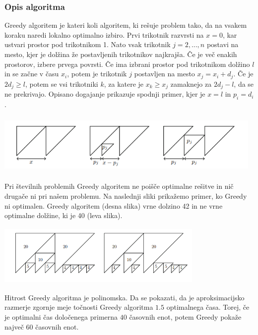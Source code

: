 \documentclass[a4paper,12pt]{article}
\theoremstyle{definition}
\theoremstyle{plain}
\begin{document}
\subsubsection{Opis algoritma}
Greedy algoritem je kateri koli algoritem, ki rešuje problem tako, da na vsakem koraku naredi lokalno optimalno izbiro. Prvi trikotnik razvrsti na $x=0$, kar ustvari prostor pod trikotnikom 1.
Nato vsak trikotnik $j=2,...,n$ postavi na mesto, kjer je dolžina že postavljenih trikotnikov najkrajša. Če je več enakih prostorov, izbere prvega povrsti.
Če ima izbrani prostor pod trikotnikom dolžino $l$ in se začne v času $x_i$, potem je trikotnik $j$ postavljen na mesto $x_j=x_i+d_j$. Če je $2d_j \ge l$,  potem se vsi trikotniki $k$, za katere je $x_k \ge x_j$ zamaknejo za $ 2d_j-l$, da se ne prekrivajo. Opisano 
dogajanje prikazuje spodnji primer, kjer je $x=l$ in $ p_i = d_i $.
\begin{center}
    \includegraphics[width=13cm, height=3cm]{greedy.png} 
 \end{center}
Pri številnih problemih Greedy algoritem ne poišče optimalne rešitve in nič drugače ni pri našem problemu.
Na naslednji sliki prikažemo primer, ko Greedy ni optimalen. Greedy algoritem (desna slika) vrne dolzino 42 in ne vrne optimalne dolžine, ki je 40 (leva slika).
\begin{center}
    \includegraphics[width=10cm, height=3cm]{primer_neoptimalnosti_greedy.png} 
 \end{center}
Hitrost Greedy algoritma je polinomska. Da se pokazati, da je aproksimacijsko razmerje zgornje meje točnosti Greedy algoritma $1.5$ optimalnega časa. Torej, če je optimalni čas določenega primerna
$40$ časovnih enot, potem Greedy pokaže največ $60$ časovnih enot.

\newpage
\end{document}
